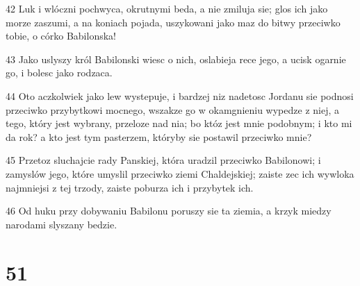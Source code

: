\par 42 Luk i wlóczni pochwyca, okrutnymi beda, a nie zmiluja sie; glos ich jako morze zaszumi, a na koniach pojada, uszykowani jako maz do bitwy przeciwko tobie, o córko Babilonska!
\par 43 Jako uslyszy król Babilonski wiesc o nich, oslabieja rece jego, a ucisk ogarnie go, i bolesc jako rodzaca.
\par 44 Oto aczkolwiek jako lew wystepuje, i bardzej niz nadetosc Jordanu sie podnosi przeciwko przybytkowi mocnego, wszakze go w okamgnieniu wypedze z niej, a tego, który jest wybrany, przeloze nad nia; bo któz jest mnie podobnym; i kto mi da rok? a kto jest tym pasterzem, któryby sie postawil przeciwko mnie?
\par 45 Przetoz sluchajcie rady Panskiej, która uradzil przeciwko Babilonowi; i zamyslów jego, które umyslil przeciwko ziemi Chaldejskiej; zaiste zec ich wywloka najmniejsi z tej trzody, zaiste poburza ich i przybytek ich.
\par 46 Od huku przy dobywaniu Babilonu poruszy sie ta ziemia, a krzyk miedzy narodami slyszany bedzie.

\chapter{51}

